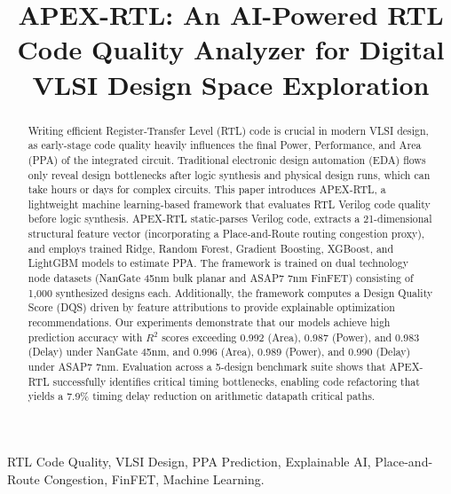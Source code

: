 \documentclass[conference]{IEEEtran}
\begin{document}
\title{APEX-RTL: An AI-Powered RTL Code Quality Analyzer for Digital VLSI Design Space Exploration}

\author{
}

\maketitle

\begin{abstract}
Writing efficient Register-Transfer Level (RTL) code is crucial in modern VLSI design, as early-stage code quality heavily influences the final Power, Performance, and Area (PPA) of the integrated circuit. Traditional electronic design automation (EDA) flows only reveal design bottlenecks after logic synthesis and physical design runs, which can take hours or days for complex circuits. This paper introduces APEX-RTL, a lightweight machine learning-based framework that evaluates RTL Verilog code quality before logic synthesis. APEX-RTL static-parses Verilog code, extracts a 21-dimensional structural feature vector (incorporating a Place-and-Route routing congestion proxy), and employs trained Ridge, Random Forest, Gradient Boosting, XGBoost, and LightGBM models to estimate PPA. The framework is trained on dual technology node datasets (NanGate 45nm bulk planar and ASAP7 7nm FinFET) consisting of 1,000 synthesized designs each. Additionally, the framework computes a Design Quality Score (DQS) driven by feature attributions to provide explainable optimization recommendations. Our experiments demonstrate that our models achieve high prediction accuracy with $R^2$ scores exceeding 0.992 (Area), 0.987 (Power), and 0.983 (Delay) under NanGate 45nm, and 0.996 (Area), 0.989 (Power), and 0.990 (Delay) under ASAP7 7nm. Evaluation across a 5-design benchmark suite shows that APEX-RTL successfully identifies critical timing bottlenecks, enabling code refactoring that yields a 7.9\% timing delay reduction on arithmetic datapath critical paths.
\end{abstract}

\begin{IEEEkeywords}
RTL Code Quality, VLSI Design, PPA Prediction, Explainable AI, Place-and-Route Congestion, FinFET, Machine Learning.
\end{IEEEkeywords}
\end{document}
